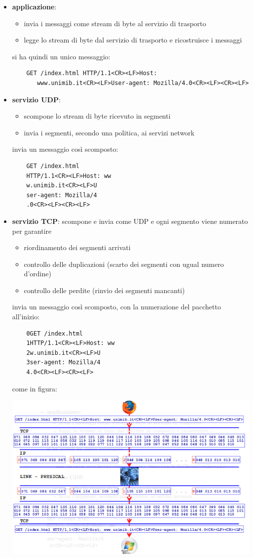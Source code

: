 \message{ !name(sd.tex)}\documentclass[a4paper,12pt, oneside]{book}
\begin{document}
\begin{itemize}
	\item \textbf{applicazione}:
	\begin{itemize}
		\item invia i messaggi come stream di byte al servizio di trasporto
		\item legge lo stream di byte dal servizio di trasporto e ricostruisce i messaggi
\end{itemize}
	si ha quindi un unico messaggio:
	\begin{verbatim}
	GET /index.html HTTP/1.1<CR><LF>Host:
	   www.unimib.it<CR><LF>User-agent: Mozilla/4.0<CR><LF><CR><LF> 
	\end{verbatim}
	\item \textbf{servizio UDP}:
	\begin{itemize}
		\item scompone lo stream di byte ricevuto in segmenti 
		\item invia i segmenti, secondo una politica, ai servizi network
\end{itemize}
invia un messaggio così scomposto:
	\begin{verbatim}
	GET /index.html 
	HTTP/1.1<CR><LF>Host: ww
	w.unimib.it<CR><LF>U
	ser-agent: Mozilla/4
	.0<CR><LF><CR><LF>  
	\end{verbatim}
	\item \textbf{servizio TCP}: 
	scompone e invia come UDP e ogni segmento viene numerato per garantire
	\begin{itemize}
		\item riordinamento dei segmenti arrivati 
		\item controllo delle duplicazioni (scarto dei segmenti con ugual numero d'ordine)
		\item controllo delle perdite (rinvio dei segmenti mancanti) 
\end{itemize}
invia un messaggio così scomposto, con la numerazione del pacchetto all'inizio:
	\begin{verbatim}
	0GET /index.html 
	1HTTP/1.1<CR><LF>Host: ww
	2w.unimib.it<CR><LF>U
	3ser-agent: Mozilla/4
	4.0<CR><LF><CR><LF>  
	\end{verbatim}
	come in figura:
	\begin{center}
		
		\includegraphics[scale=2.7]{img/send.png}
	\end{center}
\end{itemize}
\newpage
\end{document}
